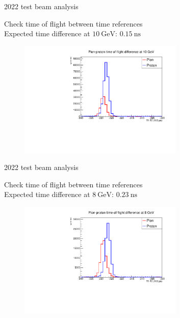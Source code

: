 \documentclass[xcolor={dvipsnames}]{beamer}
\begin{document}
\begin{frame}{2022 test beam analysis}
  \vspace{0.0cm}
  \begin{center}
    {\large Check time of flight between time references}\\
    {\normalsize Expected time difference at $\SI{10}{\giga\eV}$: $\SI{0.15}{\nano\second}$}
  \end{center}
  \begin{figure}
    \centering
    \includegraphics[width = 0.7\textwidth]{Figs/PionProton_TimeDiff_10GeV.pdf}
  \end{figure}
\end{frame}

\begin{frame}{2022 test beam analysis}
  \vspace{0.0cm}
  \begin{center}
    {\large Check time of flight between time references}\\
    {\normalsize Expected time difference at $\SI{8}{\giga\eV}$: $\SI{0.23}{\nano\second}$}
  \end{center}
  \begin{figure}
    \centering
    \includegraphics[width = 0.7\textwidth]{Figs/PionProton_TimeDiff_8GeV.pdf}
  \end{figure}
\end{frame}
\end{document}
